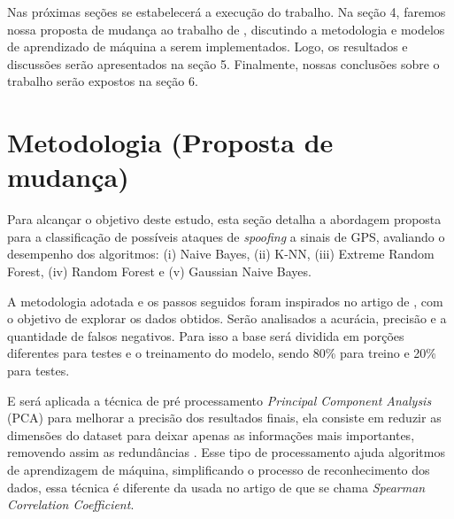 \documentclass[12pt]{article}
\begin{document}
Nas próximas seções se estabelecerá a execução do trabalho. Na seção 4, faremos 
nossa proposta de mudança ao trabalho de \cite{Aissou2021}, discutindo a 
metodologia e modelos de aprendizado de máquina a
serem implementados. Logo, os resultados e 
discussões serão apresentados na seção 5.
Finalmente, nossas conclusões sobre o trabalho serão expostos na seção 6.

\section{Metodologia (Proposta de mudança)}

Para alcançar o objetivo deste estudo, esta seção detalha a abordagem proposta para a classificação de possíveis ataques de \textit{spoofing} 
a sinais de GPS, avaliando o desempenho dos algoritmos: (i) Naive Bayes, (ii) K-NN, (iii) Extreme Random Forest, (iv) Random Forest e (v)  Gaussian Naive Bayes.

A metodologia adotada e os passos seguidos foram inspirados no artigo de \cite{Aissou2021}, com o objetivo de explorar os dados obtidos. Serão analisados a acurácia, 
precisão e a quantidade de falsos negativos. 
Para isso a base será dividida em porções diferentes para testes e o treinamento do modelo, sendo 80\% para treino e 20\% para testes. 

E será aplicada a técnica de pré processamento \textit{Principal Component Analysis} (PCA) para melhorar a precisão dos resultados finais, ela consiste em reduzir as dimensões do dataset para deixar apenas as informações mais importantes, removendo assim as redundâncias \cite{IBM02025}. 
Esse tipo de processamento ajuda algoritmos de aprendizagem de máquina, simplificando o processo de reconhecimento dos dados, essa técnica é
diferente da usada no artigo de \cite{Aissou2021} que se chama \textit{Spearman Correlation Coefficient}.






\printbibliography
\end{document}
